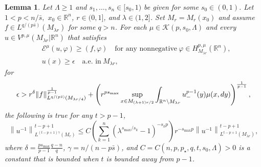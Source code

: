 \documentclass[10pt,a4paper]{amsart}
\newtheorem{lemma}{Lemma}
\newcommand{\R}{\mathbb{R}}
\renewcommand{\d}{\textnormal{d}}
\begin{document}
\begin{lemma} \label{lem:iteration}
Let $\Lambda \ge 1$ and $s_1,\dots,s_n\in[s_0,1)$ be given for some $s_0\in(0,1)$. Let $1<p<  n/\bar{s},$ $x_0 \in \R^n$, $r\in(0,1]$, and $\lambda \in (1,2]$. Set $M_r = M_r(x_0)$ and assume $f\in L^{q/(p\bar{s})}(M_{\lambda r})$ for some $q>n$. 
For each $\mu \in \mathcal{K}(p,s_0, \Lambda)$ and every $u \in V^{p,\mu}(M_{\lambda r} | \R^n)$ that satisfies 
\begin{align*}
&\mathcal{E}^\mu(u, \varphi) \geq (f, \varphi) \quad \text{for any nonnegative}~ \varphi \in H^{p,\mu}_{M_{\lambda r}}(\R^n), \\
&u(x) \geq \epsilon \quad \text{a.e. in}~ M_{\lambda r},
\end{align*}
for
\begin{equation*}
\epsilon > r^{\delta}\|f\|_{L^{q/(p\bar{s})}(M_{\lambda r/4})}^{\frac{1}{p-1}} + \left( r^{ps_{\max}} \sup_{x \in M_{(\lambda+1)r/2}} \int_{\mathbb{R}^n \setminus M_{\lambda r}} u_-^{p-1}(y) \mu(x, \d y) \right)^{\frac{1}{p-1}},
\end{equation*}
the following is true for any $t > p-1$,
\begin{equation*}
\left\|u^{-1}\right\|_{L^{(t-p+1)\gamma}(M_r)}^{t-p+1} \leq C \left( \sum_{k=1}^n \left( \lambda^{s_{\max}/s_k}-1 \right)^{-s_k p} \right) r^{-s_{\max}p} \left\|u^{-1}\right\|_{L^{t-p+1}(M_{\lambda r})}^{t-p+1},
\end{equation*}
where $\delta = \frac{ps_{\max}}{p-1} \frac{q-n}{q}$, $\gamma = n/(n-p\bar{s})$, and $C = C(n, p, p_{\star}, q, t, s_0, \Lambda) > 0$ is a constant that is bounded when $t$ is bounded away from $p-1$.
\end{lemma}
\end{document}
